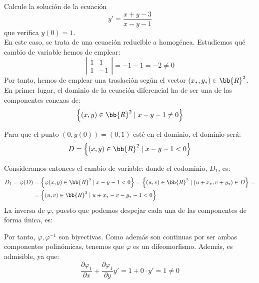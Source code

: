 \begin{ejercicio}
    Calcule la solución de la ecuación
    \begin{equation*}
        y' = \dfrac{x + y - 3}{x - y - 1}
    \end{equation*}
    que verifica $y(0) = 1$.\\

    En este caso, se trata de una ecuación reducible a homogénea.
    Estudiemos qué cambio de variable hemos de emplear:
    \begin{equation*}
        \left|\begin{array}{cc}
            1 & 1\\
            1 & -1
        \end{array}\right| = -1-1=-2\neq 0
    \end{equation*}
    Por tanto, hemos de emplear una traslación según el vector $(x_\ast,y_\ast)\in \bb{R}^2$.
    En primer lugar, el dominio de la ecuación diferencial ha de ser una de las componentes conexas de:
    \begin{equation*}
        \left\{(x,y)\in \bb{R}^2 \mid x-y-1\neq 0\right\}
    \end{equation*}

    Para que el punto $(0,y(0))=(0,1)$ esté en el dominio, el dominio será:
    \begin{equation*}
        D=\left\{(x,y)\in \bb{R}^2 \mid x-y-1< 0\right\}
    \end{equation*}

    Consideramos entonces el cambio de variable:
    donde el codominio, $D_1$, es:
    \begin{align*}
        D_1=\varphi(D)&=\left\{\varphi(x,y)\in \bb{R}^2 \mid x-y-1< 0\right\} = \left\{(u,v)\in \bb{R}^2 \mid (u+x_\ast, v+y_\ast)\in D\right\} =\\
        &= \left\{(u,v)\in \bb{R}^2 \mid u+x_\ast - v-y_\ast-1<0\right\}
    \end{align*}
    La inversa de $\varphi$, puesto que podemos despejar cada una de las componentes de forma única, es:

    Por tanto, $\varphi, \varphi^{-1}$ son biyectivas. Como además son continuas por ser ambas componentes polinómicas, tenemos que $\varphi$ es un difeomorfismo. Además, es admisible, ya que:
    \begin{equation*}
        \dfrac{\partial \varphi_1}{\partial x} + \dfrac{\partial \varphi_1}{\partial y} y' = 1 + 0\cdot y'=1 \neq 0
    \end{equation*}


\end{ejercicio}
